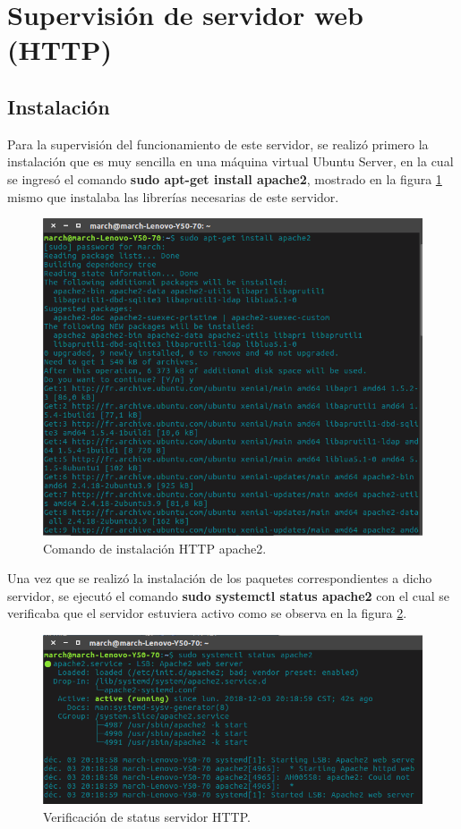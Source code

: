 \section{Supervisión de servidor web (HTTP)}
\subsection{Instalación}
Para la supervisión del funcionamiento de este servidor, se realizó primero la instalación que es muy sencilla en una máquina virtual Ubuntu Server, en la cual se ingresó el comando \textbf{sudo apt-get install apache2}, mostrado en la figura \ref{image:http1} mismo que instalaba las librerías necesarias de este servidor.

\FloatBarrier
\begin{figure}[htbp!]
		\centering
			\includegraphics[width=.68 \textwidth]{images/http1}
		\caption{Comando de instalación HTTP apache2.}
		\label{image:http1}
\end{figure}
\FloatBarrier

Una vez que se realizó la instalación de los paquetes correspondientes a dicho servidor, se ejecutó el comando \textbf{sudo systemctl status apache2} con el cual se verificaba que el servidor estuviera activo como se observa en la figura \ref{image:http2}.

\FloatBarrier
\begin{figure}[htbp!]
		\centering
			\includegraphics[width=.75 \textwidth]{images/http2}
		\caption{Verificación de status servidor HTTP.}
		\label{image:http2}
\end{figure}
\FloatBarrier

